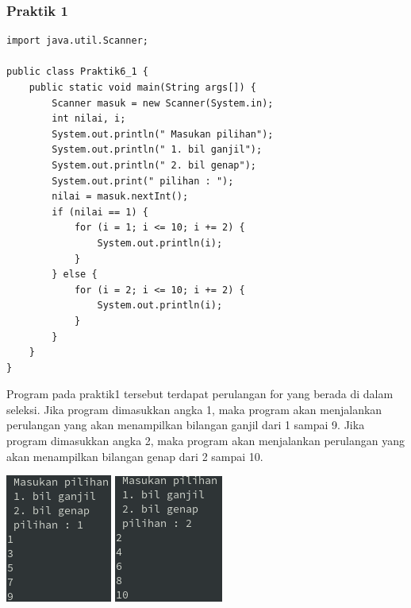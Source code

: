 \documentclass[a4paper,12pt]{article}
\begin{document}
\subsubsection{Praktik 1}
\begin{lstlisting}
import java.util.Scanner;

public class Praktik6_1 {
    public static void main(String args[]) {
        Scanner masuk = new Scanner(System.in);
        int nilai, i;
        System.out.println(" Masukan pilihan");
        System.out.println(" 1. bil ganjil");
        System.out.println(" 2. bil genap");
        System.out.print(" pilihan : ");
        nilai = masuk.nextInt();
        if (nilai == 1) {
            for (i = 1; i <= 10; i += 2) {
                System.out.println(i);
            }
        } else {
            for (i = 2; i <= 10; i += 2) {
                System.out.println(i);
            }
        }
    }
}
\end{lstlisting}
Program pada praktik1 tersebut terdapat perulangan for yang berada di dalam seleksi. Jika program dimasukkan angka 1, maka program akan menjalankan perulangan yang akan menampilkan 
bilangan ganjil dari 1 sampai 9. Jika program dimasukkan angka 2, maka program akan menjalankan perulangan yang akan menampilkan bilangan genap dari 2 sampai 10.
\begin{center}
    \includegraphics{1.png} 
    \includegraphics{2.png} 
\end{center}
\end{document}
